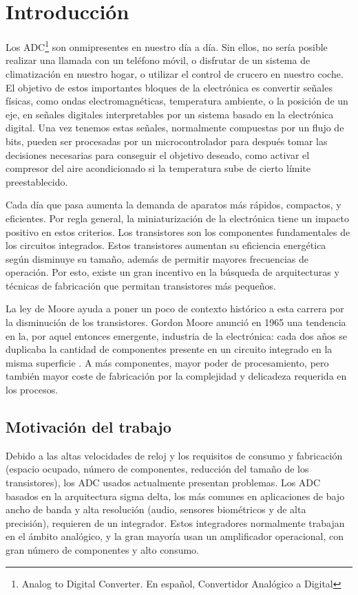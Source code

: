 \documentclass[12pt]{report} %
\begin{document}
\chapter{Introducción}

	Los ADC\footnote{Analog to Digital Converter. En español, Convertidor Analógico a Digital} son onmipresentes en nuestro día a día. Sin ellos, no sería posible realizar una llamada con un teléfono móvil, o disfrutar de un sistema de climatización en nuestro hogar, o utilizar el control de crucero en nuestro coche. El objetivo de estos importantes bloques de la electrónica es convertir señales físicas, como ondas electromagnéticas, temperatura ambiente, o la posición de un eje, en señales digitales interpretables por un sistema basado en la electrónica digital. Una vez tenemos estas señales, normalmente compuestas por un flujo de bits, pueden ser procesadas por un microcontrolador para después tomar las decisiones necesarias para conseguir el objetivo deseado, como activar el compresor del aire acondicionado si la temperatura sube de cierto límite preestablecido.
	
	Cada día que pasa aumenta la demanda de aparatos más rápidos, compactos, y eficientes. Por regla general, la miniaturización de la electrónica tiene un impacto positivo en estos criterios. Los transistores son los componentes fundamentales de los circuitos integrados. Estos transistores aumentan su eficiencia energética según disminuye su tamaño, además de permitir mayores frecuencias de operación. Por esto, existe un gran incentivo en la búsqueda de arquitecturas y técnicas de fabricación que permitan transistores más pequeños.
	
	La ley de Moore ayuda a poner un poco de contexto histórico a esta carrera por la disminución de los transistores. Gordon Moore anunció en 1965 una tendencia en la, por aquel entonces emergente, industria de la electrónica: cada dos años se duplicaba la cantidad de componentes presente en un circuito integrado en la misma superficie \cite{moorelaw}. A más componentes, mayor poder de procesamiento, pero también mayor coste de fabricación por la complejidad y delicadeza requerida en los procesos.
	
	\section{Motivación del trabajo}
	
	Debido a las altas velocidades de reloj y los requisitos de consumo y fabricación (espacio ocupado, número de componentes, reducción del tamaño de los transistores), los ADC usados actualmente presentan problemas. Los ADC basados en la arquitectura sigma delta, los más comunes en aplicaciones de bajo ancho de banda y alta resolución (audio, sensores biométricos y de alta precisión), requieren de un integrador. Estos integradores normalmente trabajan en el ámbito analógico, y la gran mayoría usan un amplificador operacional, con gran número de componentes y alto consumo.
	
\end{document}
